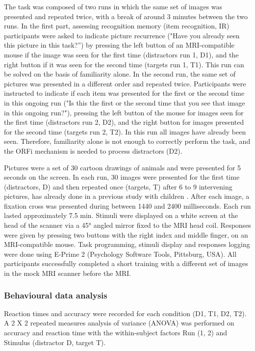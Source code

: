The task was composed of two runs in which the same set of images was presented and repeated twice, with a break of around 3 minutes between the two runs. In the first part, assessing recognition memory (item recognition, IR) participants were asked to indicate picture recurrence ("Have you already seen this picture in this task?”) by pressing the left button of an MRI-compatible mouse if the image was seen for the first time (distractors run 1, D1), and the right button if it was seen for the second time (targets run 1, T1). This run can be solved on the basis of familiarity alone. In the second run, the same set of pictures was presented in a different order and repeated twice. Participants were instructed to indicate if each item was presented for the first or the second time in this ongoing run ("Is this the first or the second time that you see that image in this ongoing run?"), pressing the left button of the mouse for images seen for the first time (distractors run 2, D2), and the right button for images presented for the second time (targets run 2, T2). In this run all images have already been seen. Therefore, familiarity alone is not enough to correctly perform the task, and the ORFi mechanism is needed to process distractors (D2).

Pictures were a set of 30 cartoon drawings of animals and were presented for 5 seconds on the screen. In each run, 30 images were presented for the first time (distractors, D) and then repeated once (targets, T) after 6 to 9 intervening pictures, has already done in a previous study with children \citep{Liverani2017}. After each image, a fixation cross was presented during between 1440 and 2400 milliseconds. Each run lasted approximately 7.5 min. Stimuli were displayed on a white screen at the head of the scanner via a 45° angled mirror fixed to the MRI head coil. Responses were given by pressing two buttons with the right index and middle finger, on an MRI-compatible mouse. Task programming, stimuli display and responses logging were done using E-Prime 2 (Psychology Software Tools, Pittsburg, USA). All participants successfully completed a short training with a different set of images in the mock MRI scanner before the MRI.

\subsubsection{Behavioural data analysis} 
Reaction times and accuracy were recorded for each condition (D1, T1, D2, T2). A 2 X 2 repeated measures analysis of variance (ANOVA) was performed on accuracy and reaction time with the within-subject factors Run (1, 2) and Stimulus (distractor D, target T). 

